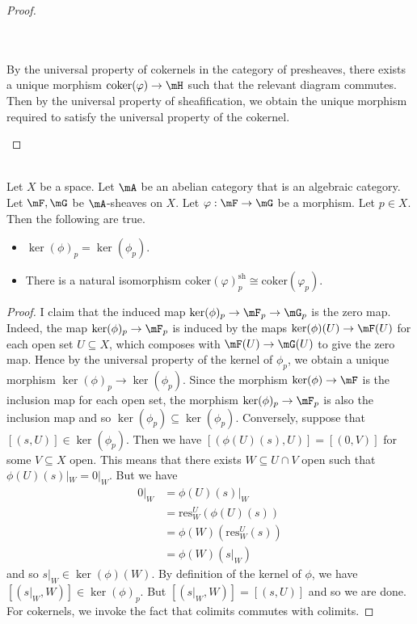 \documentclass[a4paper]{article}
\begin{document}
\begin{prp}{}{}
\begin{proof}
\begin{itemize}
{} \\~\\
By the universal property of cokernels in the category of presheaves, there exists a unique morphism $\text{coker}(\varphi)\to\mH$ such that the relevant diagram commutes. Then by the universal property of sheafification, we obtain the unique morphism required to satisfy the universal property of the cokernel. 
\end{itemize}
\end{proof}
\end{prp}

\begin{prp}{}{}\\
Let $X$ be a space. Let $\mA$ be an abelian category that is an algebraic category. Let $\mF,\mG$ be $\mA$-sheaves on $X$. Let $\varphi:\mF\to\mG$ be a morphism. Let $p\in X$. Then the following are true. 
\begin{itemize}
\item $\ker(\phi)_p=\ker(\phi_p)$. 
\item There is a natural isomorphism $\text{coker}(\varphi)_p^\text{sh}\cong\text{coker}(\varphi_p)$. 
\end{itemize}
\begin{proof}
I claim that the induced map $\ker(\phi)_p\to\mF_p\to\mG_p$ is the zero map. Indeed, the map $\ker(\phi)_p\to\mF_p$ is induced by the maps $\ker(\phi)(U)\to\mF(U)$ for each open set $U\subseteq X$, which composes with $\mF(U)\to\mG(U)$ to give the zero map. Hence by the universal property of the kernel of $\phi_p$, we obtain a unique morphism $\ker(\phi)_p\to\ker(\phi_p)$. Since the morphism $\ker(\phi)\to\mF$ is the inclusion map for each open set, the morphism $\ker(\phi)_p\to\mF_p$ is also the inclusion map and so $\ker(\phi_p)\subseteq\ker(\phi_p)$. Conversely, suppose that $[(s,U)]\in\ker(\phi_p)$. Then we have $[(\phi(U)(s),U)]=[(0,V)]$ for some $V\subseteq X$ open. This means that there exists $W\subseteq U\cap V$ open such that $\phi(U)(s)|_W=0|_W$. But we have 
\begin{align*}
0|_W&=\phi(U)(s)|_W\\
&=\text{res}_W^U(\phi(U)(s))\\
&=\phi(W)(\text{res}_W^U(s))\tag{$\phi$ is a morphism}\\
&=\phi(W)(s|_W)
\end{align*}
and so $s|_W\in\ker(\phi)(W)$. By definition of the kernel of $\phi$, we have $[(s|_W,W)]\in\ker(\phi)_p$. But $[(s|_W,W)]=[(s,U)]$ and so we are done. \\

For cokernels, we invoke the fact that colimits commutes with colimits. 
\end{proof}
\end{prp}
\end{document}
